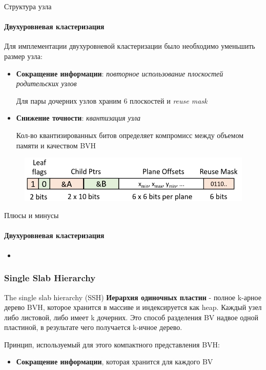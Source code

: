 \documentclass{beamer}
\begin{document}
\begin{frame}[t]{Структура узла}
    \framesubtitle{Двухуровневая кластеризация}
    Для имплементации двухуровневой кластеризации было необходимо уменьшить размер узла:
    \begin{itemize}
        \item
            \textbf{Сокращение информации}: \textit{повторное использование плоскостей родительских узлов}

            Для пары дочерних узлов храним 6 плоскостей и \textit{reuse mask}
        \item
            \textbf{Снижение точности}: \textit{квантизация узла}

            Кол-во квантизированных битов определяет компромисс между объемом памяти и качеством BVH

    \end{itemize}

    \begin{figure}
        \begin{center}
            \includegraphics[keepaspectratio, width=\textwidth]{res/8byte_node.png}
        \end{center}
    \end{figure}
\end{frame}

\begin{frame}[t]{Плюсы и минусы}
    \framesubtitle{Двухуровневая кластеризация}
    \begin{itemize}
        \item
    \end{itemize}
\end{frame}

\begin{frame}
    \frametitle{Single Slab Hierarchy}
    \begin{block}{The single slab hierarchy (SSH)}
        \textbf{Иерархия одиночных пластин} - полное k-арное дерево BVH, которое хранится в массиве
        и индексируется как heap.
        Каждый узел либо листовой, либо имеет k дочерних.
        Это способ разделения BV надвое одной пластиной,
        в результате чего получается k-ичное дерево.
    \end{block}

    Принцип, используемый для этого компактного представления BVH:
    \begin{itemize}
        \item
            \textbf{Сокращение информации}, которая хранится для каждого BV
    \end{itemize}

\end{frame}
\end{document}
